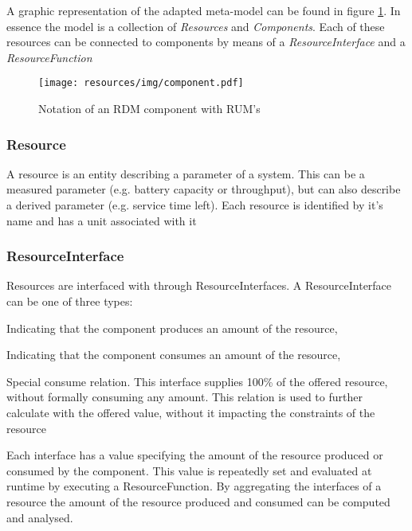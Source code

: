 A graphic representation of the adapted meta-model can be found in figure \ref{fig:component}. In essence the model is a collection of \emph{Resources} and \emph{Components}. Each of these resources can be connected to components by means of a \emph{ResourceInterface} and a \emph{ResourceFunction}
\begin{figure}
\centering
  \texttt{[image: resources/img/component.pdf]}
  \caption{Notation of an RDM component with RUM's}
  \label{fig:component}
\end{figure}

\subsubsection{Resource}
A resource is an entity describing a parameter of a system. This can be a measured parameter (e.g. battery capacity or throughput), but can also describe a derived parameter (e.g. service time left). Each resource is identified by it's name and has a unit associated with it

\subsubsection{ResourceInterface}
Resources are interfaced with through ResourceInterfaces. A ResourceInterface can be one of three types:
\begin{description}
\nospace
\item[Offer] Indicating that the component produces an amount of the resource,
\item[Consume] Indicating that the component consumes an amount of the resource,
\item[Calculate] Special consume relation. This interface supplies 100\% of the offered resource, without formally consuming any amount. This relation is used to further calculate with the offered value, without it impacting the constraints of the resource%
\end{description}
Each interface has a value specifying the amount of the resource produced or consumed by the component. This value is repeatedly set and evaluated at runtime by executing a ResourceFunction. By aggregating the interfaces of a resource the amount of the resource produced and consumed can be computed and analysed.

